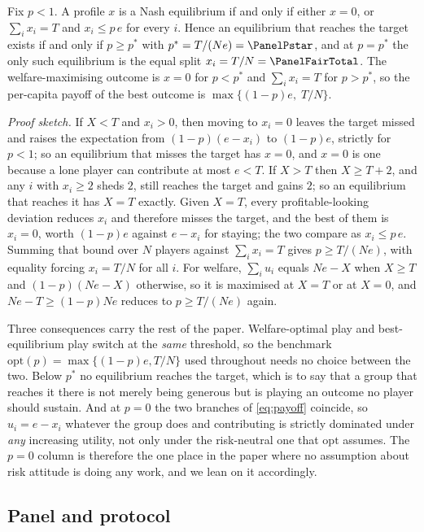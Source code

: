 \begin{proposition}
\label{prop:eq}
Fix $p<1$. A profile $x$ is a Nash equilibrium if and only if either $x=0$, or $\sum_i
x_i=T$ and $x_i\le p\,e$ for every $i$. Hence an equilibrium that reaches the target exists
if and only if $p\ge p^{*}$ with $p^{*}=T/(Ne)=\PanelPstar$, and at $p=p^{*}$ the only such
equilibrium is the equal split $x_i=T/N=\PanelFairTotal$. The welfare-maximising outcome is
$x=0$ for $p<p^{*}$ and $\sum_i x_i=T$ for $p>p^{*}$, so the per-capita payoff of the best
outcome is $\max\{(1-p)e,\;T/N\}$.
\end{proposition}

\noindent\emph{Proof sketch.} If $X<T$ and $x_i>0$, then moving to $x_i=0$ leaves the
target missed and raises the expectation from $(1-p)(e-x_i)$ to $(1-p)e$, strictly for
$p<1$; so an equilibrium that misses the target has $x=0$, and $x=0$ is one because a lone
player can contribute at most $e<T$. If $X>T$ then $X\ge T+2$, and any $i$ with $x_i\ge2$
sheds $2$, still reaches the target and gains $2$; so an equilibrium that reaches it has
$X=T$ exactly. Given $X=T$, every profitable-looking deviation reduces $x_i$ and therefore
misses the target, and the best of them is $x_i=0$, worth $(1-p)e$ against $e-x_i$ for
staying; the two compare as $x_i\le p\,e$. Summing that bound over $N$ players against
$\sum_i x_i=T$ gives $p\ge T/(Ne)$, with equality forcing $x_i=T/N$ for all $i$. For
welfare, $\sum_i u_i$ equals $Ne-X$ when $X\ge T$ and $(1-p)(Ne-X)$ otherwise, so it is
maximised at $X=T$ or at $X=0$, and $Ne-T\ge(1-p)Ne$ reduces to $p\ge T/(Ne)$
again.\hfill\crgqed

Three consequences carry the rest of the paper. Welfare-optimal play and best-equilibrium
play switch at the \emph{same} threshold, so the benchmark
$\mathrm{opt}(p)=\max\{(1-p)e,T/N\}$ used throughout needs no choice between the two.
Below $p^{*}$ no equilibrium reaches the target, which is to say that a group that reaches
it there is not merely being generous but is playing an outcome no player should sustain.
And at $p=0$ the two branches of \eqref{eq:payoff} coincide, so $u_i=e-x_i$ whatever the
group does and contributing is strictly dominated under \emph{any} increasing utility,
not only under the risk-neutral one that $\mathrm{opt}$ assumes. The $p=0$ column is
therefore the one place in the paper where no assumption about risk attitude is doing any
work, and we lean on it accordingly.

\subsection{Panel and protocol}

